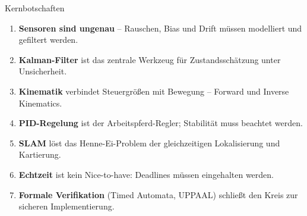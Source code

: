 \documentclass[%
  aspectratio=169,
  10pt
]{beamer}
\begin{document}
\begin{frame}{Kernbotschaften}

\begin{enumerate}
  \item \textbf{Sensoren sind ungenau} -- Rauschen, Bias und Drift
        müssen modelliert und gefiltert werden.
  \item \textbf{Kalman-Filter} ist das zentrale Werkzeug für
        Zustandsschätzung unter Unsicherheit.
  \item \textbf{Kinematik} verbindet Steuergrößen mit Bewegung --
        Forward und Inverse Kinematics.
  \item \textbf{PID-Regelung} ist der Arbeitspferd-Regler;
        Stabilität muss beachtet werden.
  \item \textbf{SLAM} löst das Henne-Ei-Problem der gleichzeitigen
        Lokalisierung und Kartierung.
  \item \textbf{Echtzeit} ist kein Nice-to-have: Deadlines müssen
        eingehalten werden.
  \item \textbf{Formale Verifikation} (Timed Automata, UPPAAL)
        schließt den Kreis zur sicheren Implementierung.
\end{enumerate}

\end{frame}
\end{document}
